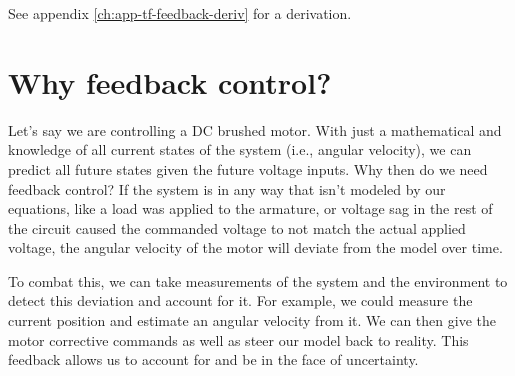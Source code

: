 See appendix \ref{ch:app-tf-feedback-deriv} for a derivation.

\section{Why feedback control?}

Let's say we are controlling a DC brushed motor. With just a mathematical
 and knowledge of all current \glspl{state}
of the \gls{system} (i.e., angular velocity), we can predict all future
\glspl{state} given the future voltage \glspl{input}. Why then do we need
feedback control? If the system is  in any way
that isn't modeled by our equations, like a load was applied to the armature, or
voltage sag in the rest of the circuit caused the commanded voltage to not match
the actual applied voltage, the angular velocity of the motor will deviate from
the \gls{model} over time.

To combat this, we can take measurements of the system and the environment to
detect this deviation and account for it. For example, we could measure the
current position and estimate an angular velocity from it. We can then give the
motor corrective commands as well as steer our \gls{model} back to reality. This
feedback allows us to account for and be  in the
face of uncertainty.
